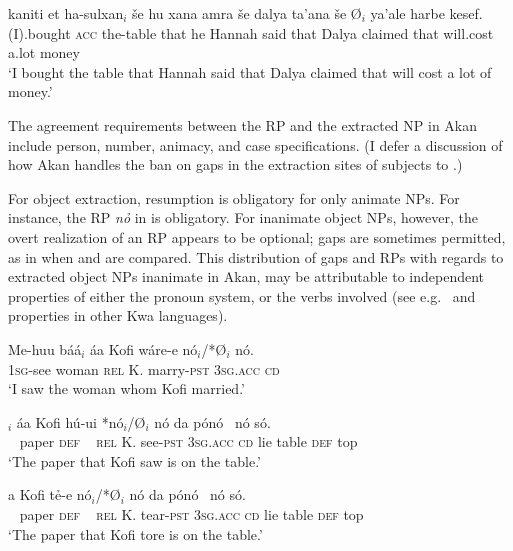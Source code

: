 \documentclass[output=paper]{LSP/langsci}
\begin{document}
\ex\label{ex:korsah:5b}
\gll *kaniti et ha-sulxan$_i$ \v se hu xana amra \v se dalya ta'ana \v se \O$_i$ ya'ale harbe kesef.\\
(I).bought \textsc{acc} the-table that he Hannah said that Dalya claimed that {} will.cost a.lot money \\
\glt  `I bought the table that Hannah said that Dalya claimed that will cost a lot of money.'
\z
\z

The agreement requirements between the RP and the extracted NP in Akan include person, number, animacy, and case specifications. (I defer a discussion of how Akan handles the ban on gaps in the extraction sites of subjects to .) 
 
For object extraction, resumption is  obligatory for only animate NPs.  For instance,  the RP \textit{n\h o} in  is obligatory. For inanimate object NPs, however, the overt realization of an RP appears to be optional; gaps are sometimes permitted, as in when  and  are compared. This distribution of gaps and RPs with regards to extracted object NPs inanimate in Akan, may be attributable to independent properties of either the pronoun system, or the verbs involved (see e.g.\ \citealt{Chinebuah76} and \citealt{Larson05}  properties in other Kwa languages).


\ea\label{ex:korsah:7} 
\gll  Me-huu \oor b{\'{a}}{\'{a}}$_i$  {\'{a}}a Kofi w{\'{a}}re-e n{\'{o}}$_i$/*\O $_i$ n{\'{o}}.\\
 \textsc{1sg}-see woman \textsc{rel} K. marry-\textsc{pst}  \textsc{3sg.acc} \textsc{cd} \\
\glt  `I saw the woman whom Kofi married.' \hfill  \citep[92]{Saah10}
\z


\ea\label{8} %
\ea\label{ex:korsah:8a}
\gll [ K{\'{r}}ata{\'{a}} n{\'{o}} ]$_i$ {\'{a}}a Kofi h{\'{u}}-ui *n{\'{o}}$_i$/\O $_i$ n{\'{o}} da p{\'{o}}n{\'{o}} \ n{\'{o}} s{\'{o}}.\\
 ~ paper  \textsc{def} ~  \textsc{rel} K. see-\textsc{pst} \textsc{3sg.acc} \textsc{cd} lie table \textsc{def} top \\
\glt  `The paper that Kofi saw is on the table.'

\ex\label{ex:korsah:8b}
a Kofi t\h e-e n{\'{o}}$_i$/*\O $_i$ n{\'{o}} da p{\'{o}}n{\'{o}} \ n{\'{o}} s{\'{o}}.\\
~ paper \textsc{def} ~ \textsc{rel} K. tear-\textsc{pst}  \textsc{3sg.acc} \textsc{cd} lie table \textsc{def} top \\
\glt  `The paper that Kofi tore is on the table.'
\end{document}
